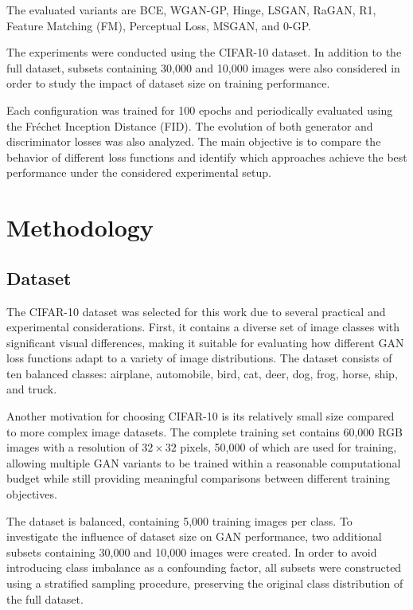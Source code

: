 \documentclass[conference]{IEEEtran}
\begin{document}
The evaluated variants are BCE, WGAN-GP, Hinge, LSGAN, RaGAN, R1, Feature Matching (FM), Perceptual Loss, MSGAN, and 0-GP.

The experiments were conducted using the CIFAR-10 dataset. In addition to the full dataset, subsets containing 30,000 and 10,000 images were also considered in order to study the impact of dataset size on training performance.

Each configuration was trained for 100 epochs and periodically evaluated using the Fréchet Inception Distance (FID). The evolution of both generator and discriminator losses was also analyzed. The main objective is to compare the behavior of different loss functions and identify which approaches achieve the best performance under the considered experimental setup.




\section{Methodology}

\subsection{Dataset}

The CIFAR-10 dataset was selected for this work due to several practical and experimental considerations. First, it contains a diverse set of image classes with significant visual differences, making it suitable for evaluating how different GAN loss functions adapt to a variety of image distributions. The dataset consists of ten balanced classes: airplane, automobile, bird, cat, deer, dog, frog, horse, ship, and truck.

Another motivation for choosing CIFAR-10 is its relatively small size compared to more complex image datasets. The complete training set contains 60,000 RGB images with a resolution of $32 \times 32$ pixels, 50,000 of which are used for training, allowing multiple GAN variants to be trained within a reasonable computational budget while still providing meaningful comparisons between different training objectives.

The dataset is balanced, containing 5,000 training images per class. To investigate the influence of dataset size on GAN performance, two additional subsets containing 30,000 and 10,000 images were created. In order to avoid introducing class imbalance as a confounding factor, all subsets were constructed using a stratified sampling procedure, preserving the original class distribution of the full dataset.
\end{document}
